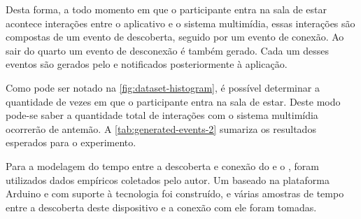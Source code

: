 Desta forma, a todo momento em que o participante entra na sala de estar acontece interações entre o aplicativo e o sistema multimídia, essas interações são compostas de um evento de descoberta, seguido por um evento de conexão.
Ao sair do quarto um evento de desconexão é também gerado. Cada um desses eventos são gerados pelo \stwopa e notificados posteriormente à aplicação.

Como pode ser notado na \autoref{fig:dataset-histogram}, é possível determinar a quantidade de vezes em que o participante entra na sala de estar.
Deste modo pode-se saber a quantidade total de interações com o sistema multimídia ocorrerão de antemão.
A \autoref{tab:generated-events-2} sumariza os resultados esperados para o experimento.

\begin{table}[htb]
	\begin{center}
	\end{center}
\end{table}

Para a modelagem do tempo entre a descoberta e conexão do \smartphone e o \smartobj, foram utilizados dados empíricos coletados pelo autor.
Um \smartobj baseado na plataforma Arduino e com suporte à tecnologia \ble foi construído, e várias amostras de tempo entre a descoberta deste dispositivo e a conexão com ele foram tomadas.


